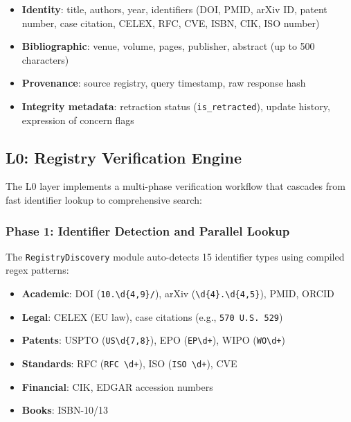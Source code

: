 \documentclass[sigconf,nonacm]{acmart}
\begin{document}
\begin{itemize}[leftmargin=*]
    \item \textbf{Identity}: title, authors, year, identifiers (DOI, PMID, arXiv ID, patent number, case citation, CELEX, RFC, CVE, ISBN, CIK, ISO number)
    \item \textbf{Bibliographic}: venue, volume, pages, publisher, abstract (up to 500 characters)
    \item \textbf{Provenance}: source registry, query timestamp, raw response hash
    \item \textbf{Integrity metadata}: retraction status (\texttt{is\_retracted}), update history, expression of concern flags
\end{itemize}

\subsection{L0: Registry Verification Engine}
\label{sec:l0}

The L0 layer implements a multi-phase verification workflow that cascades from fast identifier lookup to comprehensive search:

\subsubsection{Phase 1: Identifier Detection and Parallel Lookup}

The \texttt{RegistryDiscovery} module auto-detects 15 identifier types using compiled regex patterns:

\begin{itemize}[leftmargin=*]
    \item \textbf{Academic}: DOI (\texttt{10.\textbackslash d\{4,9\}/}), arXiv (\texttt{\textbackslash d\{4\}.\textbackslash d\{4,5\}}), PMID, ORCID
    \item \textbf{Legal}: CELEX (EU law), case citations (e.g., \texttt{570 U.S. 529})
    \item \textbf{Patents}: USPTO (\texttt{US\textbackslash d\{7,8\}}), EPO (\texttt{EP\textbackslash d+}), WIPO (\texttt{WO\textbackslash d+})
    \item \textbf{Standards}: RFC (\texttt{RFC \textbackslash d+}), ISO (\texttt{ISO \textbackslash d+}), CVE
    \item \textbf{Financial}: CIK, EDGAR accession numbers
    \item \textbf{Books}: ISBN-10/13
\end{itemize}
\end{document}
